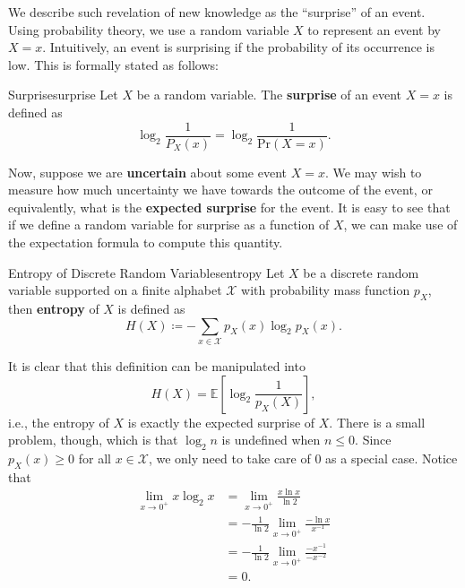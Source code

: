 \documentclass[math]{amznotes}
\theoremstyle{remark}
\begin{document}
We describe such revelation of new knowledge as the ``surprise'' of an event. Using probability theory, we use a random variable $X$ to represent an event by $X = x$. Intuitively, an event is surprising if the probability of its occurrence is low. This is formally stated as follows:
\begin{dfnbox}{Surprise}{surprise}
    Let $X$ be a random variable. The {\color{red} \textbf{surprise}} of an event $X = x$ is defined as 
    \begin{equation*}
        \log_2\frac{1}{P_X\left(x\right)} = \log_2\frac{1}{\mathrm{Pr}\left(X = x\right)}.
    \end{equation*}
\end{dfnbox}
Now, suppose we are \textbf{uncertain} about some event $X = x$. We may wish to measure how much uncertainty we have towards the outcome of the event, or equivalently, what is the \textbf{expected surprise} for the event. It is easy to see that if we define a random variable for surprise as a function of $X$, we can make use of the expectation formula to compute this quantity.
\begin{dfnbox}{Entropy of Discrete Random Variables}{entropy}
    Let $X$ be a discrete random variable supported on a finite alphabet $\mathcal{X}$ with probability mass function $p_X$, then {\color{red} \textbf{entropy}} of $X$ is defined as
    \begin{equation*}
        H\left(X\right) \coloneqq -\sum_{x \in \mathcal{X}}p_X\left(x\right)\log_{2}p_X\left(x\right).
    \end{equation*}
\end{dfnbox}
It is clear that this definition can be manipulated into 
\begin{equation*}
    H\left(X\right) = \mathbb{E}\left[\log_2\frac{1}{p_X\left(X\right)}\right],
\end{equation*}
i.e., the entropy of $X$ is exactly the expected surprise of $X$. There is a small problem, though, which is that $\log_2n$ is undefined when $n \leq 0$. Since $p_X\left(x\right) \geq 0$ for all $x \in \mathcal{X}$, we only need to take care of $0$ as a special case. Notice that 
\begin{align*}
    \lim_{x \to 0^+}x\log_2x & = \lim_{x \to 0^+}\frac{x\ln x}{\ln 2} \\
    & = -\frac{1}{\ln 2}\lim_{x \to 0^+}\frac{-\ln x}{x^{-1}} \\
    & = -\frac{1}{\ln 2}\lim_{x \to 0^+}\frac{-x^{-1}}{-x^{-2}} \\
    & = 0.
\end{align*}
\end{document}
